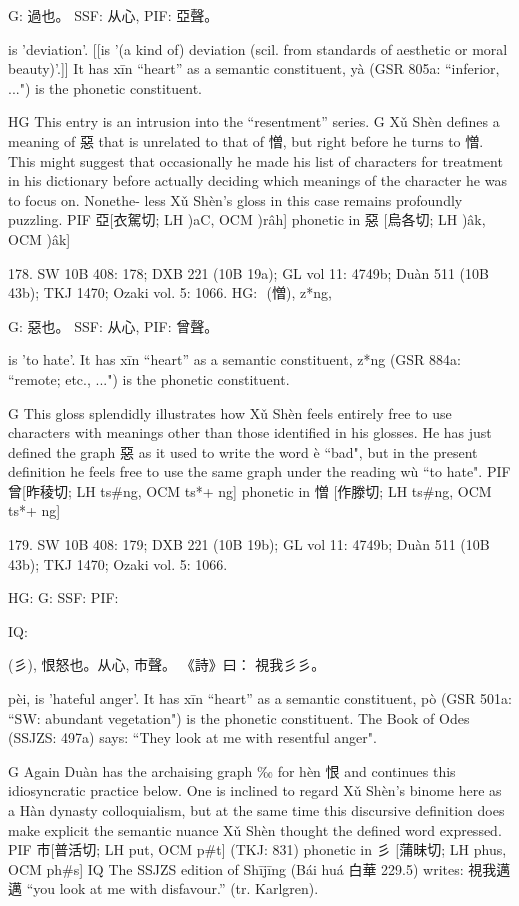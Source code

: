 G:	過也。
SSF: 从心,
PIF: 亞聲。

is 'deviation'. [[is '(a kind of) deviation (scil. from standards of aesthetic or moral beauty)'.]]
It has xīn ``heart'' as a semantic constituent,
yà (GSR 805a: ``inferior, ...") is the phonetic constituent.

HG This entry is an intrusion into the ``resentment'' series.
G  Xǔ Shèn defines a meaning of 惡 that is unrelated to that of 憎, but right before he turns to 憎. This might suggest that occasionally he made his list of characters for treatment in his dictionary before actually deciding which meanings of the character he was to focus on. Nonethe- less Xǔ Shèn's gloss in this case remains profoundly puzzling.
PIF     亞[衣駕切; LH )aC, OCM )râh] phonetic in 惡 [烏各切; LH )âk, OCM )âk]



178. SW 10B 408: 178; DXB 221 (10B 19a); GL vol 11: 4749b; Duàn 511 (10B 43b); TKJ 1470; Ozaki vol. 5: 1066.
HG:  (憎), z*ng,

G:	惡也。
SSF: 从心,
PIF: 曾聲。

is 'to hate'.
It has xīn ``heart'' as a semantic constituent,
z*ng (GSR 884a: ``remote; etc., ...") is the phonetic constituent.

G This gloss splendidly illustrates how Xǔ Shèn feels entirely free to use characters with meanings other than those identified in his glosses. He has just defined the graph 惡 as it used to write the word è ``bad", but in the present definition he feels free to use the same graph under the reading wù ``to hate".
PIF   曾[昨稜切; LH ts\#ng, OCM ts*+ ng] phonetic in 憎 [作滕切; LH ts\#ng, OCM ts*+ ng]

179. SW 10B 408: 179; DXB 221 (10B 19b); GL vol 11: 4749b; Duàn 511 (10B 43b); TKJ 1470; Ozaki vol. 5: 1066.


HG:
G: SSF: PIF:

IQ:

(彡),
恨怒也。从心,
巿聲。
《詩》曰： 視我彡彡。

pèi,
is 'hateful anger'.
It has xīn ``heart'' as a semantic constituent,
pò (GSR 501a: ``SW: abundant vegetation") is the phonetic constituent.
The Book of Odes (SSJZS: 497a) says: ``They look at me with resentful anger".

G Again Duàn has the archaising graph ‰ for hèn 恨 and continues this idiosyncratic practice below.
    One is inclined to regard Xǔ Shèn's binome here as a Hàn dynasty colloquialism, but at the same time this discursive definition does make explicit the semantic nuance Xǔ Shèn thought the defined word expressed.
PIF    巿[普活切; LH put, OCM p\#t] (TKJ: 831) phonetic in 彡 [蒲昧切; LH phus, OCM ph\#s]
IQ The SSJZS edition of Shījīng (Bái huá 白華 229.5) writes: 視我邁邁 ``you look at me with disfavour.'' (tr. Karlgren).


